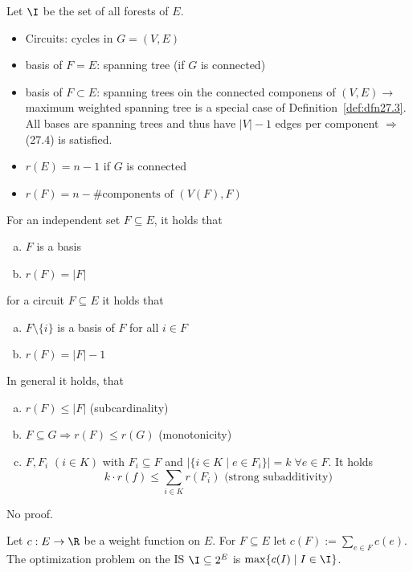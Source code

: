 \begin{xmp+}
Let $\I$ be the set of all forests of $E$.
\begin{itemize}
\item Circuits: cycles in $G = (V, E)$
\item basis of $F = E$: spanning tree (if $G$ is connected)
\item basis of $F \subset E$: spanning trees oin the connected componens of
$(V,E) \rightarrow$ maximum weighted spanning tree is a special case of
Definition~\ref{def:dfn27.3}. All bases are spanning trees and thus have
$|V|-1$ edges per component $\Rightarrow$ (27.4) is satisfied.
\item $r(E) = n-1$ if $G$ is connected
\item $r(F) = n- \text{\#components of } (V(F), F)$
\end{itemize}
\end{xmp+}

\begin{lem}\label{lem:lem27.2}
For an independent set $F \subseteq E$, it holds that
\begin{enumerate}[(a)]
\item $F$ is a basis
\item $r(F) = |F|$
\end{enumerate}
for a circuit $F \subseteq E$ it holds that
\begin{enumerate}[(a)]
\item $F \setminus \{i\}$ is a basis of $F$ for all $i \in F$
\item $r(F) = |F| - 1$
\end{enumerate}
In general it holds, that 
\begin{enumerate}[(a)]
\item $r(F) \leq |F|$ (subcardinality)
\item $F \subseteq G \Rightarrow r(F) \leq r(G)$ (monotonicity)
\item $F, F_i$ $(i \in K)$ with $F_i \subseteq F$ and $| \{ i \in K \mid e
\in F_i \}| = k \;\forall e \in F$.
It holds
\[
	k \cdot r(f) \leq \sum_{i \in K} r(F_i) \text{ (strong subadditivity)}
\]
\end{enumerate}
No proof.
\end{lem}

\begin{defn}\label{def:defn27.3}
Let $c : E \rightarrow \R$ be a weight function on $E$. For $F \subseteq E$
let $c(F) := \sum_{e \in F} c(e)$. The optimization problem on the IS $\I
\subseteq 2^E$ is $\max \{ c(I) \mid I \in \I \}$.
\end{defn}

